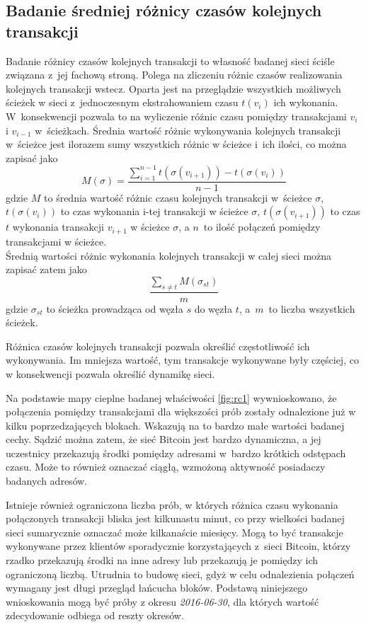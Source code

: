 \documentclass[12pt, twoside, final, openany]{mgr}
\begin{document}
\subsection{Badanie średniej różnicy czasów kolejnych transakcji}
\label{roznice_czasow}
\indent Badanie różnicy czasów kolejnych transakcji to własność badanej sieci ściśle związana z~jej fachową stroną. Polega na zliczeniu różnic czasów realizowania kolejnych transakcji wstecz. Oparta jest na przeglądzie wszystkich możliwych ścieżek w sieci z~jednoczesnym ekstrahowaniem czasu $t(v_i)$ ich wykonania. W~konsekwencji pozwala to na wyliczenie różnic czasu pomiędzy transakcjami $v_i$ i $v_{i-1}$ w~ścieżkach. Średnia wartość różnic wykonywania kolejnych transakcji w~ścieżce jest ilorazem sumy wszystkich różnic w ścieżce i~ich ilości, co można zapisać jako
\begin{equation}
\label{eq:rckt}
M(\sigma) = \frac{\sum_{i=1}^{n-1} t(\sigma(v_{i+1})) - t(\sigma(v_{i}))}{n-1}
\end{equation}
gdzie $M$ to średnia wartość różnic czasu kolejnych transakcji w~ścieżce $\sigma$, $t(\sigma(v_i))$ to czas wykonania i-tej transakcji w ścieżce $\sigma$, $t(\sigma(v_{i+1}))$ to czas $t$ wykonania transakcji $v_{i+1}$ w ścieżce $\sigma$, a $n$~to ilość połączeń pomiędzy transakcjami w ścieżce. 
\\ Średnią wartości różnic wykonania kolejnych transakcji w całej sieci można zapisać zatem jako
\begin{equation}
\label{eq:rckt}
\frac{\sum_{s \ne t}^{} M(\sigma_{st})}{m}
\end{equation}
gdzie $\sigma_{st}$ to ścieżka prowadząca od węzła $s$ do węzła $t$, a~$m$~to liczba wszystkich ścieżek.

\indent Różnica czasów kolejnych transakcji pozwala określić 
częstotliwość ich wykonywania. Im mniejsza wartość, tym transakcje wykonywane były częściej, co w konsekwencji pozwala określić dynamikę sieci.

\indent Na podstawie mapy cieplne badanej właściwości \ref{fig:rc1} wywnioskowano, że połączenia pomiędzy transakcjami dla większości prób zostały odnalezione już w kilku poprzedzających blokach. Wskazują na to bardzo małe wartości badanej cechy. Sądzić można zatem, że sieć Bitcoin jest bardzo dynamiczna, a jej uczestnicy przekazują środki pomiędzy adresami w~bardzo krótkich odstępach czasu. Może to również oznaczać ciągłą, wzmożoną aktywność posiadaczy badanych adresów.

\indent Istnieje również ograniczona liczba prób, w których różnica czasu wykonania połączonych transakcji bliska jest kilkunastu minut, co przy wielkości badanej sieci sumarycznie oznaczać może kilkanaście miesięcy. Mogą to być transakcje wykonywane przez klientów sporadycznie korzystających z~sieci Bitcoin, którzy rzadko przekazują środki na inne adresy lub przekazują je pomiędzy ich ograniczoną liczbą. Utrudnia to budowę sieci, gdyż w celu odnalezienia połączeń wymagany jest długi przegląd łańcucha bloków.  Podstawą niniejszego wnioskowania mogą być próby z okresu \textit{2016-06-30}, dla których wartość zdecydowanie odbiega od reszty okresów. 
\end{document}
